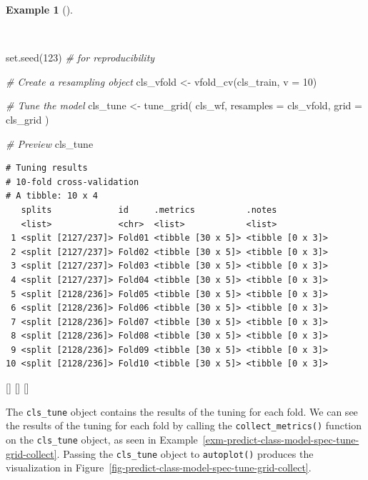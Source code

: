 \documentclass[
  letterpaper,
  krantz1]{latex/krantz-mod}
\newenvironment{Shaded}{\begin{snugshade}}{\end{snugshade}}
\newcommand{\AttributeTok}[1]{\textcolor[rgb]{0.00,0.00,0.00}{#1}}
\newcommand{\CommentTok}[1]{\textcolor[rgb]{0.00,0.00,0.00}{\textit{#1}}}
\newcommand{\DecValTok}[1]{\textcolor[rgb]{0.00,0.00,0.00}{#1}}
\newcommand{\FunctionTok}[1]{\textcolor[rgb]{0.00,0.00,0.00}{#1}}
\newcommand{\NormalTok}[1]{\textcolor[rgb]{0.00,0.00,0.00}{#1}}
\newcommand{\OtherTok}[1]{\textcolor[rgb]{0.00,0.00,0.00}{#1}}
\newcommand{\cindex}[1]{%
  \StrSubstitute{#1}{_}{\_}[\temp]%
  \index{\temp}%
}
\theoremstyle{definition}
\theoremstyle{definition}
\newtheorem{example}{Example}[chapter]
\theoremstyle{remark}
\begin{document}
\begin{example}[]\protect\hypertarget{exm-predict-class-model-spec-tune-grid-cv}{}\label{exm-predict-class-model-spec-tune-grid-cv}

~

\begin{Shaded}
\begin{Highlighting}[numbers=left,,]
\FunctionTok{set.seed}\NormalTok{(}\DecValTok{123}\NormalTok{) }\CommentTok{\# for reproducibility}

\CommentTok{\# Create a resampling object}
\NormalTok{cls\_vfold }\OtherTok{\textless{}{-}} \FunctionTok{vfold\_cv}\NormalTok{(cls\_train, }\AttributeTok{v =} \DecValTok{10}\NormalTok{)}

\CommentTok{\# Tune the model}
\NormalTok{cls\_tune }\OtherTok{\textless{}{-}}
  \FunctionTok{tune\_grid}\NormalTok{(}
\NormalTok{    cls\_wf,}
    \AttributeTok{resamples =}\NormalTok{ cls\_vfold,}
    \AttributeTok{grid =}\NormalTok{ cls\_grid}
\NormalTok{    )}

\CommentTok{\# Preview}
\NormalTok{cls\_tune}
\end{Highlighting}
\end{Shaded}

\begin{verbatim}
# Tuning results
# 10-fold cross-validation 
# A tibble: 10 x 4
   splits             id     .metrics          .notes          
   <list>             <chr>  <list>            <list>          
 1 <split [2127/237]> Fold01 <tibble [30 x 5]> <tibble [0 x 3]>
 2 <split [2127/237]> Fold02 <tibble [30 x 5]> <tibble [0 x 3]>
 3 <split [2127/237]> Fold03 <tibble [30 x 5]> <tibble [0 x 3]>
 4 <split [2127/237]> Fold04 <tibble [30 x 5]> <tibble [0 x 3]>
 5 <split [2128/236]> Fold05 <tibble [30 x 5]> <tibble [0 x 3]>
 6 <split [2128/236]> Fold06 <tibble [30 x 5]> <tibble [0 x 3]>
 7 <split [2128/236]> Fold07 <tibble [30 x 5]> <tibble [0 x 3]>
 8 <split [2128/236]> Fold08 <tibble [30 x 5]> <tibble [0 x 3]>
 9 <split [2128/236]> Fold09 <tibble [30 x 5]> <tibble [0 x 3]>
10 <split [2128/236]> Fold10 <tibble [30 x 5]> <tibble [0 x 3]>
\end{verbatim}

\cindex{vfold_cv()}\cindex{tune_grid()}\cindex{set.seed()}

\end{example}

The \texttt{cls\_tune} object contains the results of the tuning for
each fold. We can see the results of the tuning for each fold by calling
the \texttt{collect\_metrics()} function on the \texttt{cls\_tune}
object, as seen in
Example~\ref{exm-predict-class-model-spec-tune-grid-collect}. Passing
the \texttt{cls\_tune} object to \texttt{autoplot()} produces the
visualization in
Figure~\ref{fig-predict-class-model-spec-tune-grid-collect}.
\end{document}
